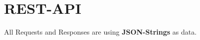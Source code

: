 \section{REST-API}

\newcommand{\returnline}[1]{\textbf{Returns:} #1}
\newcommand{\return}[2]{\textbf{Returns:} #1
  \begin{addmargin}{0.05\textwidth}
  #2
  \end{addmargin}
}
\newcommand{\param}[2]{\textbf{Request-Body:} #1
  \begin{addmargin}{0.05\textwidth}
  #2
  \end{addmargin}
}

All Requests and Responses are using \textbf{JSON-Strings} as data.







\newpage
\newpage
